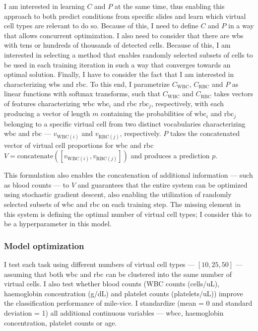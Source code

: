 I am interested in learning $C$ and $P$ at the same time, thus enabling this approach to both predict conditions from specific slides and learn which virtual cell types are relevant to do so. Because of this, I need to define $C$ and $P$ in a way that allows concurrent optimization. I also need to consider that there are \ac{wbs} with tens or hundreds of thousands of detected  cells. Because of this, I am interested in selecting a method that enables randomly selected subsets of cells to be used in each training iteration in such a way that converges towards an optimal solution.  Finally, I have to consider the fact that I am interested in characterizing \ac{wbs} and \ac{rbc}. To this end, I parametrize $C_{\mathrm{WBC}}$, $C_{\mathrm{RBC}}$ and $P$ as linear functions with softmax transforms, such that $C_{\mathrm{WBC}}$ and $C_{\mathrm{RBC}}$ takes vectors of features characterizing \ac{wbc} $\mathrm{wbc}_i$ and \ac{rbc} $\mathrm{rbc}_j$, respectively, with each producing a vector of length $m$ containing the probabilities of $\mathrm{wbc}_i$ and $\mathrm{rbc}_j$ belonging to a specific virtual cell from two distinct vocabularies characterizing \ac{wbc} and \ac{rbc} --- $v_{\mathrm{WBC}(i)}$ and $v_{\mathrm{RBC}(j)}$, respectively. $P$ takes the concatenated vector of virtual cell proportions for \ac{wbc} and \ac{rbc} $V=\mathrm{concatenate}([v_{\mathrm{WBC}(i)},v_{\mathrm{RBC}(j)}])$ and produces a prediction $p$. 

This formulation also enables the concatenation of additional information --- such as blood counts --- to $V$ and guarantees that the entire system can be optimized using stochastic gradient descent, also enabling the utilization of randomly selected subsets of \ac{wbc} and \ac{rbc} on each training step. The missing element in this system is defining the optimal number of virtual cell types; I consider this to be a hyperparameter in this model.

\subsubsection{Model optimization}

I test each task using different numbers of virtual cell types --- $[10, 25, 50]$ --- assuming that both \ac{wbc} and \ac{rbc} can be clustered into the same number of virtual cells. I also test whether blood counts (WBC counts (cells/uL), haemoglobin concentration (g/dL) and platelet counts (platelets/uL)) improve the classification performance of \ac{mile-vice}. I standardize (mean = 0 and standard deviation = 1) all additional continuous variables --- \ac{wbcc}, haemoglobin concentration, platelet counts or age. 

